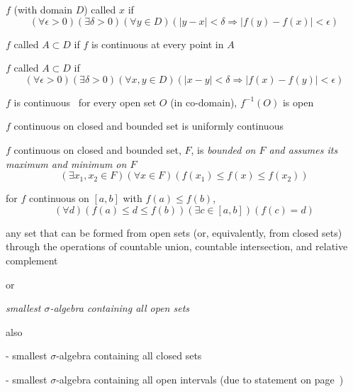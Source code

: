 \documentclass[17pt,landscape]{foils}
\begin{document}
{	\eit
\eit



\bit
	\item $f$ (with domain $D$) called  $x$ if
	\[
		(\forall\epsilon >0)(\exists \delta>0)(\forall y\in D)(|y-x|<\delta \Rightarrow |f(y)-f(x)|<\epsilon)
	\]

	\vitem $f$ called  $A\subset D$ if $f$ is continuous at every point in $A$

	\vitem $f$ called  $A\subset D$ if
	\[
		(\forall\epsilon >0)(\exists \delta>0)(\forall x,y\in D)(|x-y|<\delta \Rightarrow |f(x)-f(y)|<\epsilon)
	\]
\eit



\bit
	\item $f$ is continuous \iaoi\ for every open set $O$ (in co-domain), $f^{-1}(O)$ is open

	\vitem $f$ continuous on closed and bounded set is uniformly continuous

	\vvitem {}
		$f$ continuous on closed and bounded set, $F$, is \emph{bounded on $F$ and assumes its maximum and minimum on $F$}
		\[
			(\exists x_1, x_2 \in F)(\forall x\in F)(f(x_1) \leq f(x) \leq f(x_2))
		\]

	\vitem {}
		for $f$ continuous on $[a,b]$ with $f(a) \leq f(b)$,
		\[
			(\forall d)(f(a) \leq d \leq f(b))(\exists c\in[a,b])(f(c) = d)
		\]
\eit



\bit
	\item {}%
	\bit
		\item any set that can be formed from open sets (or, equivalently, from closed sets)
		through the operations of countable union, countable intersection, and relative complement
	\eit

	\vitem {} or %
	\bit
		\item
		\emph{smallest $\sigma$-algebra containing all open sets}

		\vitem also
		\bit
			\item [-] smallest $\sigma$-algebra containing all closed sets
			\item [-] smallest $\sigma$-algebra containing all open intervals
				(due to statement on page~\pageref{page:open-set-in-reals-is-union-of-countable-collection-of-disjoint-open-intervals})
		\eit
	\eit
\eit
\vfill


}
\end{document}
